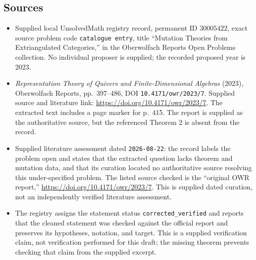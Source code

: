 \documentclass[11pt]{article}
\begin{document}
\subsection{Sources}
\begin{itemize}
\item Supplied local UnsolvedMath registry record, permanent ID \(30005422\), exact source problem code \texttt{catalogue entry}, title ``Mutation Theories from Extriangulated Categories,'' in the Oberwolfach Reports Open Problems collection. No individual proposer is supplied; the recorded proposed year is 2023.
\item \emph{Representation Theory of Quivers and Finite-Dimensional Algebras} (2023), Oberwolfach Reports, pp.~397--486, DOI \texttt{10.4171/owr/2023/7}. Supplied source and literature link: \url{https://doi.org/10.4171/owr/2023/7}. The extracted text includes a page marker for p.~415. The report is supplied as the authoritative source, but the referenced Theorem 2 is absent from the record.
\item Supplied literature assessment dated \texttt{2026-08-22}: the record labels the problem open and states that the extracted question lacks theorem and mutation data, and that its curation located no authoritative source resolving this under-specified problem. The listed source checked is the ``original OWR report,'' \url{https://doi.org/10.4171/owr/2023/7}. This is supplied dated curation, not an independently verified literature assessment.
\item The registry assigns the statement status \texttt{corrected\_verified} and reports that the cleaned statement was checked against the official report and preserves its hypotheses, notation, and target. This is a supplied verification claim, not verification performed for this draft; the missing theorem prevents checking that claim from the supplied excerpt.
\end{itemize}
\end{document}
